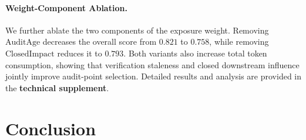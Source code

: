 \documentclass[letterpaper]{article} %
\begin{document}

\paragraph{Weight-Component Ablation.} We further ablate the two components of the exposure weight. Removing \(\mathrm{AuditAge}\) decreases the overall score from \(0.821\) to \(0.758\), while removing \(\mathrm{ClosedImpact}\) reduces it to \(0.793\). Both variants also increase total token consumption, showing that verification staleness and closed downstream influence jointly improve audit-point selection. Detailed results and analysis are provided in the \textbf{technical supplement}.



\section{Conclusion}

\end{document}
